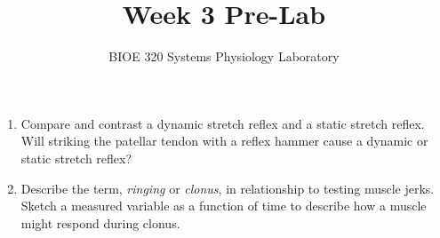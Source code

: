 \documentclass{article}
\title{Week 3 Pre-Lab}
\author{BIOE 320 Systems Physiology Laboratory}
\date{}
\begin{document}
\maketitle
\large

\begin{enumerate}
	\item Compare and contrast a dynamic stretch reflex and a static stretch reflex. Will striking the patellar tendon with a reflex hammer cause a dynamic or static stretch reflex?
	\item Describe the term, \textit{ringing} or \textit{clonus}, in relationship to testing muscle jerks. Sketch a measured variable as a function of time to describe how a muscle might respond during clonus.
\end{enumerate}
\end{document}
